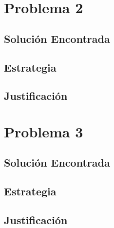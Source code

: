 \documentclass[12pt]{article}
\begin{document}

\newpage
\section{Problema 2}

\subsection{Solución Encontrada}

\subsection{Estrategia}

\subsection{Justificación}

\section{Problema 3}

\subsection{Solución Encontrada}

\subsection{Estrategia}

\subsection{Justificación}
\end{document}
